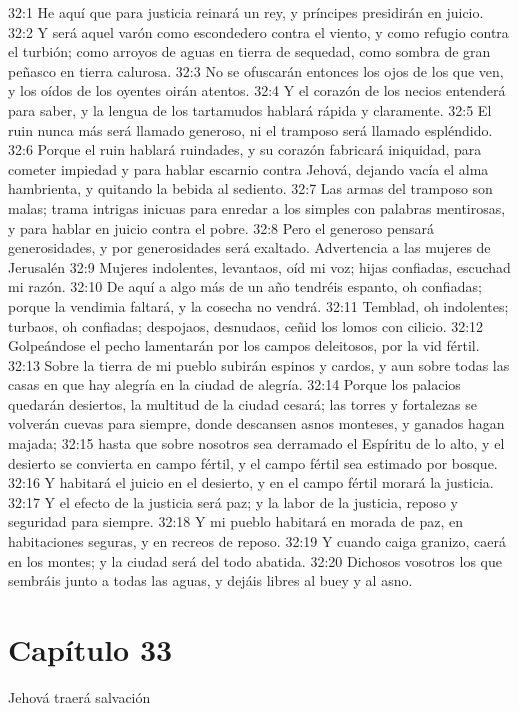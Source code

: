 32:1 He aquí que para justicia reinará un rey, y príncipes presidirán en juicio. 
32:2 Y será aquel varón como escondedero contra el viento, y como refugio contra el turbión; como arroyos de aguas en tierra de sequedad, como sombra de gran peñasco en tierra calurosa. 
32:3 No se ofuscarán entonces los ojos de los que ven, y los oídos de los oyentes oirán atentos. 
32:4 Y el corazón de los necios entenderá para saber, y la lengua de los tartamudos hablará rápida y claramente. 
32:5 El ruin nunca más será llamado generoso, ni el tramposo será llamado espléndido. 
32:6 Porque el ruin hablará ruindades, y su corazón fabricará iniquidad, para cometer impiedad y para hablar escarnio contra Jehová, dejando vacía el alma hambrienta, y quitando la bebida al sediento. 
32:7 Las armas del tramposo son malas; trama intrigas inicuas para enredar a los simples con palabras mentirosas, y para hablar en juicio contra el pobre. 
32:8 Pero el generoso pensará generosidades, y por generosidades será exaltado. 
Advertencia a las mujeres de Jerusalén 
32:9 Mujeres indolentes, levantaos, oíd mi voz; hijas confiadas, escuchad mi razón. 
32:10 De aquí a algo más de un año tendréis espanto, oh confiadas; porque la vendimia faltará, y la cosecha no vendrá. 
32:11 Temblad, oh indolentes; turbaos, oh confiadas; despojaos, desnudaos, ceñid los lomos con cilicio. 
32:12 Golpeándose el pecho lamentarán por los campos deleitosos, por la vid fértil. 
32:13 Sobre la tierra de mi pueblo subirán espinos y cardos, y aun sobre todas las casas en que hay alegría en la ciudad de alegría. 
32:14 Porque los palacios quedarán desiertos, la multitud de la ciudad cesará; las torres y fortalezas se volverán cuevas para siempre, donde descansen asnos monteses, y ganados hagan majada; 
32:15 hasta que sobre nosotros sea derramado el Espíritu de lo alto, y el desierto se convierta en campo fértil, y el campo fértil sea estimado por bosque. 
32:16 Y habitará el juicio en el desierto, y en el campo fértil morará la justicia. 
32:17 Y el efecto de la justicia será paz; y la labor de la justicia, reposo y seguridad para siempre. 
32:18 Y mi pueblo habitará en morada de paz, en habitaciones seguras, y en recreos de reposo. 
32:19 Y cuando caiga granizo, caerá en los montes; y la ciudad será del todo abatida. 
32:20 Dichosos vosotros los que sembráis junto a todas las aguas, y dejáis libres al buey y al asno. 
\section*{Capítulo 33 }
Jehová traerá salvación 
 
